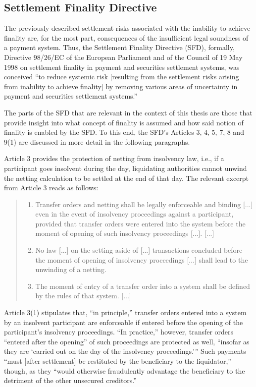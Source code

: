 \subsection{Settlement Finality Directive}

The previously described settlement risks associated with the inability to achieve finality are, for the most part, consequences of the insufficient legal soundness of a payment system.
Thus, the Settlement Finality Directive (SFD), formally, Directive 98/26/EC of the European Parliament and of the Council of 19 May 1998 on settlement finality in payment and securities settlement systems, was conceived ``to reduce systemic risk [resulting from the settlement risks arising from inability to achieve finality] by removing various areas of uncertainty in payment and securities settlement systems.'' \autocite[19]{cpmi2001}

The parts of the SFD that are relevant in the context of this thesis are those that provide insight into what concept of finality is assumed and how said notion of finality is enabled by the SFD.
To this end, the SFD's Articles 3, 4, 5, 7, 8 and 9(1) are discussed in more detail in the following paragraphs.

Article 3 provides the protection of netting from insolvency law, i.e., if a participant goes insolvent during the day, liquidating authorities cannot unwind the netting calculation to be settled at the end of that day. \autocite[19]{cpmi2001}
The relevant excerpt from Article 3 reads as follows: \autocite{eu1998sfd}

\begin{quote}
	\begin{enumerate}
		\item
			Transfer orders and netting shall be legally enforceable and binding [...] even in the event of insolvency proceedings against a participant, provided that transfer orders were entered into the system before the moment of opening of such insolvency proceedings [...]. [...]
		\item
			No law [...] on the setting aside of [...] transactions concluded before the moment of opening of insolvency proceedings [...] shall lead to the unwinding of a netting.
		\item
			The moment of entry of a transfer order into a system shall be defined by the rules of that system. [...]
	\end{enumerate}
\end{quote}

Article 3(1) stipulates that, ``in principle,'' \autocite[46]{vereecken2003} transfer orders entered into a system by an insolvent participant are enforceable if entered before the opening of the participant's insolvency proceedings.
``In practice,'' however, transfer orders ``entered after the opening'' of such proceedings are protected as well, \enquote{insofar as they are \enquote{carried out on the day of the insolvency proceedings.}} \autocite[47]{vereecken2003}
Such payments ``must [after settlement] be restituted by the beneficiary to the liquidator,'' though, as they ``would otherwise fraudulently advantage the beneficiary to the detriment of the other unsecured creditors.'' \autocite[49]{vereecken2003}

